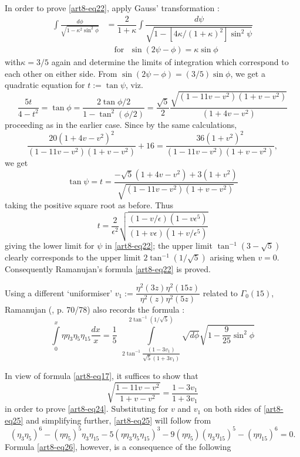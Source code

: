 In order to prove \eqref{art8-eq22}, apply Gauss' transformation \cite{art8-key12} :
\begin{align*}
\int \frac{d\phi}{\sqrt{1-\kappa^{2}\sin^{2}\phi}} &=\dfrac{2}{1+\kappa}\int \dfrac{d\psi}{\sqrt{1-[4\kappa/(1+\kappa)^{2}]\sin^{2}\psi}}\\
&\quad \text{for~ }\sin(2\psi-\phi)=\kappa\sin \phi
\end{align*}
with\pageoriginale $\kappa=3/5$ again and determine the limits of integration which correspond to each other on either side. From $\sin(2\psi-\phi)=(3/5)\sin \phi$, we get a quadratic equation for $t:=\tan\psi$, viz.
$$
\frac{5t}{4-t^{2}}=\tan\phi = \frac{2\tan\phi/2}{1-\tan^{2}(\phi/2)}=\frac{\sqrt{5}}{2}\dfrac{\sqrt{(1-11v-v^{2})(1+v-v^{2})}}{(1+4v-v^{2})}
$$
proceeding as in the earlier case. Since by the same calculations,
$$
\frac{20(1+4v-v^{2})^{2}}{(1-11v-v^{2})(1+v-v^{2})}+16=\dfrac{36(1+v^{2})^{2}}{(1-11v-v^{2})(1+v-v^{2})},
$$
we get
$$
\tan \psi=t=\dfrac{-\sqrt{5}(1+4v-v^{2})+3(1+v^{2})}{\sqrt{(1-11v-v^{2})(1+v-v^{2})}}
$$
taking the positive square root as before. Thus 
$$
t=\dfrac{2}{\epsilon^{2}}\sqrt{\dfrac{(1-v/\epsilon)(1-v\epsilon^{5})}{(1+v\epsilon)(1+v/\epsilon^{5})}}
$$
giving the lower limit for $\psi$ in \eqref{art8-eq22}; the upper limit $\tan^{-1}(3-\sqrt{5})$ clearly corresponds to the upper limit $2\tan^{-1}(1/\sqrt{5})$ arising when $v=0$. Consequently Ramanujan's formula \eqref{art8-eq22} is proved.

Using a different `uniformiser' $v_{1}:=\dfrac{\eta^{2}(3z)\eta^{2}(15z)}{\eta^{2}(z)\eta^{2}(5z)}$ related to $\Gamma_{0}(15)$, Ramanujan (\cite{art8-key11}, p. 70/78) also records the formula :
\begin{equation}
\int\limits^{x}_{0}\eta\eta_{3}\eta_{5}\eta_{15}\dfrac{dx}{x}=\dfrac{1}{5} \ \ \int\limits^{2\tan^{-1}(1/\sqrt{5})}_{2\tan^{-1}\dfrac{(1-3v_{1})}{\sqrt{5}(1+3v_{1})}}\sqrt{d\phi}{\sqrt{1-\frac{9}{25}\sin^{2}\phi}}\label{art8-eq24}
\end{equation}

In view of formula \eqref{art8-eq17}, it suffices to show that
\begin{equation}
\sqrt{\frac{1-11v-v^{2}}{1+v-v^{2}}}=\frac{1-3v_{1}}{1+3v_{1}}\label{art8-eq25}
\end{equation}
in order to prove \eqref{art8-eq24}. Substituting for $v$ and $v_{1}$ on both sides of \eqref{art8-eq25} and simplifying further, \eqref{art8-eq25} will follow from
\begin{equation}
(\eta_{3}\eta_{5})^{6}-(\eta\eta_{5})^{5}\eta_{3}\eta_{15}-5(\eta\eta_{3}\eta_{5}\eta_{15})^{3}-9(\eta\eta_{5})(\eta_{3}\eta_{15})^{5}-(\eta\eta_{15})^{6}=0.\label{art8-eq26}
\end{equation}
Formula \eqref{art8-eq26}, however, is a consequence of the following

